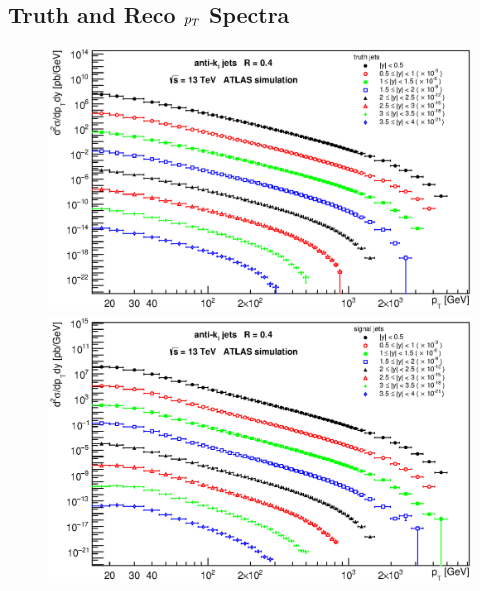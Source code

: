 \begin{appendices}
\section{Truth and Reco $p_{T}$ Spectra}
\begin{figure}[H]
  \centering
  \includegraphics[width=\textwidth]{Chapter3/ptTruthAllRapidityBins.eps}
  \includegraphics[width=\textwidth]{Chapter3/ptSignalAllRapidityBins.eps}
\end{figure}



\end{appendices}
